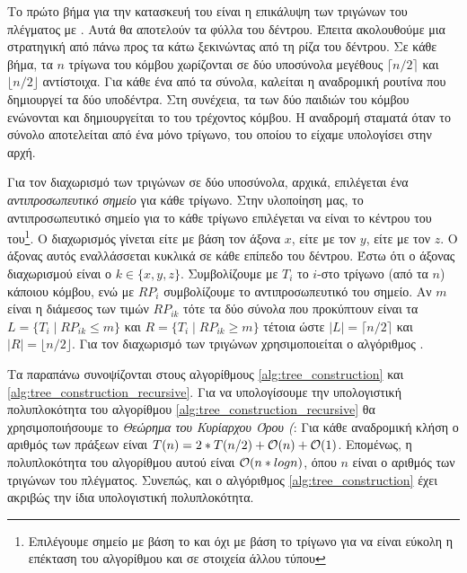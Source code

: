 Το πρώτο βήμα για την κατασκευή του  είναι η επικάλυψη 
των τριγώνων του πλέγματος με .
Αυτά θα αποτελούν τα φύλλα του δέντρου.
Έπειτα ακολουθούμε μια στρατηγική από πάνω προς τα κάτω ξεκινώντας 
από τη ρίζα του δέντρου. 
Σε κάθε βήμα, τα $n$ τρίγωνα του κόμβου χωρίζονται σε δύο υποσύνολα 
μεγέθους $\lceil n/2 \rceil$ και $\lfloor n/2\rfloor$ αντίστοιχα.
Για κάθε ένα από τα σύνολα, καλείται η αναδρομική ρουτίνα που δημιουργεί 
τα δύο υποδέντρα.  
Στη συνέχεια, τα  των δύο παιδιών του κόμβου ενώνονται 
και δημιουργείται το  του τρέχοντος κόμβου.
Η αναδρομή σταματά όταν το σύνολο αποτελείται από ένα μόνο τρίγωνο, 
του οποίου το  είχαμε υπολογίσει στην αρχή.

Για τον διαχωρισμό των τριγώνων σε δύο υποσύνολα, αρχικά, επιλέγεται 
ένα \textit{αντιπροσωπευτικό σημείο} για κάθε τρίγωνο.
Στην υλοποίηση μας, το αντιπροσωπευτικό σημείο για το κάθε τρίγωνο 
επιλέγεται να είναι το κέντρου του  του\footnote{Επιλέγουμε 
σημείο με βάση το  και όχι με βάση το τρίγωνο για να είναι 
εύκολη η επέκταση του αλγορίθμου και σε στοιχεία άλλου τύπου}.
Ο διαχωρισμός γίνεται είτε με βάση τον άξονα $x$, είτε με τον $y$, είτε 
με τον $z$.
Ο άξονας αυτός εναλλάσσεται κυκλικά σε κάθε επίπεδο του δέντρου.
Έστω ότι ο άξονας διαχωρισμού είναι ο $k \in \{x,y,z\}$. 
Συμβολίζουμε με $T_i$ το $i$-στο τρίγωνο (από τα $n$)
κάποιου κόμβου, ενώ με $RP_i$ συμβολίζουμε το αντιπροσωπευτικό του 
σημείο.
Αν $m$ είναι η διάμεσος των τιμών $RP_{ik}$ τότε τα δύο σύνολα 
που προκύπτουν είναι τα $L = \{T_i \mid RP_{ik} \leq m \}$ και 
$R = \{T_i  \mid  RP_{ik} \geq m \}$ 
τέτοια ώστε 
$|L| = \lceil n/2 \rceil$ και $|R| = \lfloor n/2 \rfloor$.
Για τον διαχωρισμό των τριγώνων χρησιμοποιείται ο 
αλγόριθμος \texttt{} \cite{hoare1961algorithm}.

Τα παραπάνω συνοψίζονται στους αλγορίθμους \ref{alg:tree_construction} και 
\ref{alg:tree_construction_recursive}.
Για να υπολογίσουμε την υπολογιστική πολυπλοκότητα του αλγορίθμου 
\ref{alg:tree_construction_recursive} θα χρησιμοποιήσουμε το 
\textit{Θεώρημα του Κυρίαρχου Όρου (}:
Για κάθε αναδρομική κλήση ο αριθμός των πράξεων είναι 
$T(n) = 2*T(n/2) + \mathcal{O}(n) + \mathcal{O}(1)$.
Επομένως, η πολυπλοκότητα του αλγορίθμου αυτού είναι 
$\mathcal{O}(n*logn)$, όπου $n$ είναι ο αριθμός των τριγώνων 
του πλέγματος.
Συνεπώς, και ο αλγόριθμος \ref{alg:tree_construction} έχει 
ακριβώς την ίδια υπολογιστική πολυπλοκότητα.

